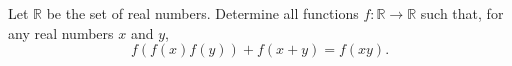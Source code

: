 Let $\mathbb{R}$ be the set of real numbers. Determine all functions $f:\mathbb{R}\to\mathbb{R}$ such that, for any real numbers $x$ and $y$, \[f\left(f\left(x\right)f\left(y\right)\right)+f\left(x+y\right)=f\left(xy\right).\]